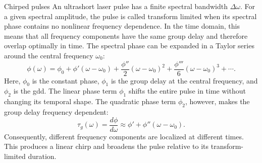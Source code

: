 \begin{aside}{Chirped pulses}
An ultrashort laser pulse has a finite spectral bandwidth $\Delta\omega$. For a given spectral amplitude, the pulse is called transform limited when its spectral phase contains no nonlinear frequency dependence. In the time domain, this means that all frequency components have the same group delay and therefore overlap optimally in time. The spectral phase can be expanded in a Taylor series around the central frequency $\omega_0$:
\begin{equation}
    \phi(\omega) = \phi_0 + \phi'(\omega-\omega_0) + \frac{\phi''}{2}(\omega-\omega_0)^2 + \frac{\phi'''}{6}(\omega-\omega_0)^3 +\cdots .
    \label{eq:spectral_phase_taylor}
\end{equation}
Here, $\phi_0$ is the constant phase, $\phi_1$ is the group delay at the central frequency, and $\phi_2$ is the \gls{gdd}. The linear phase term $\phi_1$ shifts the entire pulse in time without changing its temporal shape. The quadratic phase term $\phi_2$, however, makes the group delay frequency dependent:
\begin{equation}
    \tau_g(\omega) = \frac{d\phi}{d\omega} \approx \phi'+\phi''(\omega-\omega_0).
    \label{eq:group_delay}
\end{equation}
Consequently, different frequency components are localized at different times. This produces a linear chirp and broadens the pulse relative to its transform-limited duration.
\end{aside}


